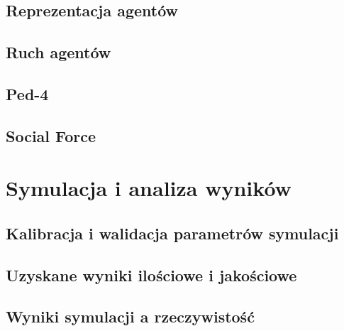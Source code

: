 \documentclass[a4paper, 12pt]{article}
\begin{document}
        \subsection{Reprezentacja agentów}
        \label{sec:actor-impl}


        \subsection{Ruch agentów}
        \label{sec:movement-impl}

        \subsection{Ped-4}
        \label{sec:ped-4-impl}

        \subsection{Social Force}
        \label{sec:social-force-impl}

\newpage
    \section{Symulacja i analiza wyników}
    \label{sec:sim}


        \subsection{Kalibracja i walidacja parametrów symulacji}
        \label{sec:p}


        \subsection{Uzyskane wyniki ilościowe i jakościowe}
        \label{sec:results}


        \subsection{Wyniki symulacji a rzeczywistość}
        \label{sec:sim-vs-reality}
\end{document}
